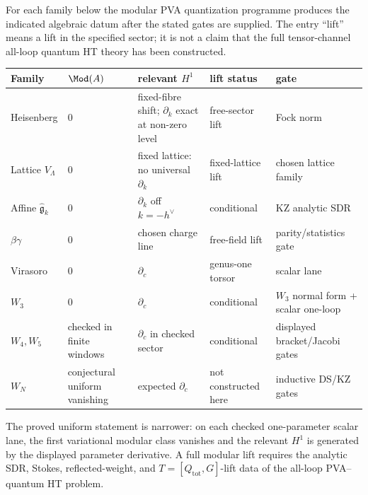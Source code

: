 \begin{construction}
For each family below the modular PVA quantization programme produces
the indicated algebraic datum after the stated gates are supplied.  The
entry ``lift'' means a lift in the specified sector; it is not a claim
that the full tensor-channel all-loop quantum HT theory has been
constructed.

\smallskip
\begin{center}
\begin{tabular}{p{} p{} p{} p{} p{}}
Family & $\Mod(A)$ & relevant $H^1$ & lift status & gate \\
\hline
Heisenberg & $0$ & fixed-fibre shift; $\partial_k$ exact at non-zero level & free-sector lift & Fock norm \\
Lattice $V_\Lambda$ & $0$ & fixed lattice: no universal $\partial_k$ & fixed-lattice lift & chosen lattice family \\
Affine $\widehat{\mathfrak g}_k$ & $0$ & $\partial_k$ off $k=-h^\vee$ & conditional & KZ analytic SDR \\
$\beta\gamma$ & $0$ & chosen charge line & free-field lift & parity/statistics gate \\
Virasoro & $0$ & $\partial_c$ & genus-one torsor & scalar lane \\
$W_3$ & $0$ & $\partial_c$ & conditional & $W_3$ normal form + scalar one-loop \\
$W_4,W_5$ & checked in finite windows & $\partial_c$ in checked sector & conditional & displayed bracket/Jacobi gates \\
$W_N$ & conjectural uniform vanishing & expected $\partial_c$ & not constructed here & inductive DS/KZ gates
\end{tabular}
\end{center}

\smallskip
\noindent
The proved uniform statement is narrower: on each checked
one-parameter scalar lane, the first variational modular class vanishes
and the relevant \(H^1\) is generated by the displayed parameter
derivative.  A full modular lift requires the analytic SDR, Stokes,
reflected-weight, and \(T=[Q_{\mathrm{tot}},G]\)-lift data of the
all-loop PVA--quantum HT problem.
\end{construction}

